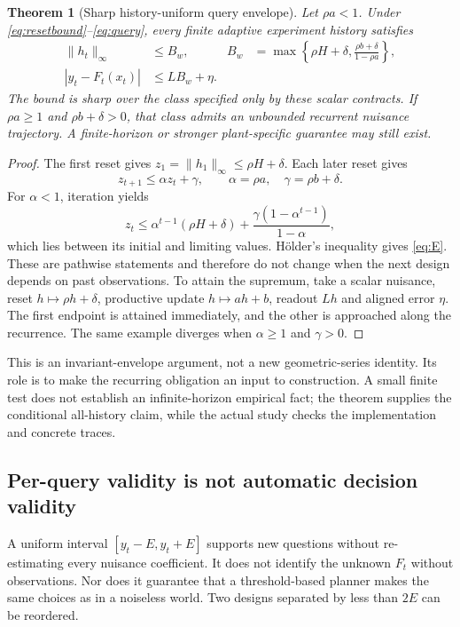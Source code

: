 \documentclass[11pt,letterpaper]{article}
\newtheorem{theorem}{Theorem}[section]
\theoremstyle{definition}\newtheorem{definition}[theorem]{Definition}
\theoremstyle{remark}\newtheorem{remark}[theorem]{Remark}
\begin{document}
\begin{theorem}[Sharp history-uniform query envelope]
\label{thm:repeat}
Let $\rho a<1$. Under \eqref{eq:resetbound}--\eqref{eq:query}, every finite adaptive experiment history satisfies
\begin{align}
 \|h_t\|_\infty&\leq B_w,
 &B_w&=\max\left\{\rho H+\delta,
             \frac{\rho b+\delta}{1-\rho a}\right\},\label{eq:B}\\
 |y_t-F_t(x_t)|&\leq LB_w+\eta.\label{eq:E}
\end{align}
The bound is sharp over the class specified only by these scalar contracts. If $\rho a\geq1$ and $\rho b+\delta>0$, that class admits an unbounded recurrent nuisance trajectory. A finite-horizon or stronger plant-specific guarantee may still exist.
\end{theorem}
\begin{proof}
The first reset gives $z_1=\|h_1\|_\infty\leq\rho H+\delta$. Each later reset gives
\begin{equation}
 z_{t+1}\leq\alpha z_t+\gamma,
 \qquad \alpha=\rho a,\quad\gamma=\rho b+\delta.
 \label{eq:recurrence}
\end{equation}
For $\alpha<1$, iteration yields
\begin{equation}
 z_t\leq \alpha^{t-1}(\rho H+\delta)
       +\frac{\gamma(1-\alpha^{t-1})}{1-\alpha},
 \label{eq:finite}
\end{equation}
which lies between its initial and limiting values. H\"older's inequality gives \eqref{eq:E}. These are pathwise statements and therefore do not change when the next design depends on past observations. To attain the supremum, take a scalar nuisance, reset $h\mapsto\rho h+\delta$, productive update $h\mapsto ah+b$, readout $Lh$ and aligned error $\eta$. The first endpoint is attained immediately, and the other is approached along the recurrence. The same example diverges when $\alpha\geq1$ and $\gamma>0$.
\end{proof}

This is an invariant-envelope argument, not a new geometric-series identity. Its role is to make the recurring obligation an input to construction. A small finite test does not establish an infinite-horizon empirical fact; the theorem supplies the conditional all-history claim, while the actual study checks the implementation and concrete traces.

\subsection{Per-query validity is not automatic decision validity}
A uniform interval $[y_t-E,y_t+E]$ supports new questions without re-estimating every nuisance coefficient. It does not identify the unknown $F_t$ without observations. Nor does it guarantee that a threshold-based planner makes the same choices as in a noiseless world. Two designs separated by less than $2E$ can be reordered.
\end{document}
